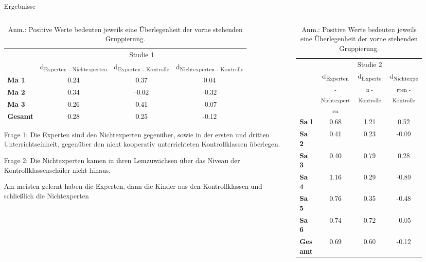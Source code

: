 \begin{block}{Ergebnisse} %
\begin{columns}[t,totalwidth=\twocolwid] %

\begin{column}{\onecolwid}
\begin{table}
\begin{tabular}{lccc}
 & \multicolumn{3}{c}{Studie 1} \\
\cmidrule{2-4}
 & d\textsubscript{Experten - Nichtexperten} & d\textsubscript{Experten - Kontrolle} & d\textsubscript{Nichtexperten - Kontrolle} \\
\midrule 
\textbf{Ma 1} & 0.24 & 0.37 & 0.04 \\
\textbf{Ma 2} & 0.34 & -0.02 & -0.32 \\
\textbf{Ma 3} & 0.26 & 0.41 & -0.07 \\
\midrule 
\textbf{Gesamt} & 0.28 & 0.25 & -0.12 \\
\bottomrule
\end{tabular}
{\caption*{Anm.: Positive Werte bedeuten jeweils eine Überlegenheit der vorne stehenden Gruppierung.}}
\end{table}

\justifying
Frage 1: Die Experten sind  den Nichtexperten gegenüber, sowie in der ersten und dritten Unterrichtseinheit, gegenüber den nicht kooperativ unterrichteten Kontrollklassen überlegen.
 
Frage 2: Die Nichtexperten kamen in ihren Lemzuwächsen über das Niveau 
der Kontrollklassenschüler nicht hinaus.

Am meisten gelernt haben die Experten, dann die Kinder aus den Kontrollklassen und schließlich die Nichtexperten
 
\end{column}

\begin{column}{\onecolwid}
\begin{table}
\begin{tabular}{lccc}
 & \multicolumn{3}{c}{Studie 2} \\
\cmidrule{2-4}
 & d\textsubscript{Experten - Nichtexperten} & d\textsubscript{Experten - Kontrolle} & d\textsubscript{Nichtexperten - Kontrolle} \\
\midrule 
\textbf{Sa l} & 0.68 & 1.21 & 0.52 \\
\textbf{Sa 2} & 0.41 & 0.23 & -0.09 \\
\textbf{Sa 3} & 0.40 & 0.79 & 0.28 \\
\textbf{Sa 4} & 1.16 & 0.29 & -0.89 \\
\textbf{Sa 5} & 0.76 & 0.35 & -0.48 \\
\textbf{Sa 6} & 0.74 & 0.72 & -0.05 \\
\midrule 
\textbf{Gesamt} & 0.69 & 0.60 & -0.12 \\
\bottomrule
\end{tabular}
{\caption*{Anm.: Positive Werte bedeuten jeweils eine Überlegenheit der vorne stehenden Gruppierung.}}
\end{table}


\end{column}
\end{columns}
\end{block}
